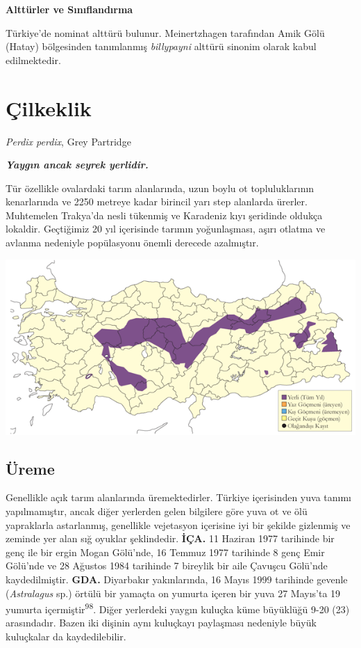 \documentclass[
  letterpaper,
  DIV=11,
  numbers=noendperiod]{scrreprt}
\begin{document}
\textbf{Alttürler ve Sınıflandırma}

Türkiye'de nominat alttürü bulunur. Meinertzhagen tarafından Amik Gölü
(Hatay) bölgesinden tanımlanmış \emph{billypayni} alttürü sinonim olarak
kabul edilmektedir.

\hypertarget{uxe7ilkeklik}{%
\section{Çilkeklik}\label{uxe7ilkeklik}}

\emph{Perdix perdix}, Grey Partridge

\textbf{\emph{Yaygın ancak seyrek yerlidir.}}

Tür özellikle ovalardaki tarım alanlarında, uzun boylu ot
topluluklarının kenarlarında ve 2250 metreye kadar birincil yarı step
alanlarda ürerler. Muhtemelen Trakya'da nesli tükenmiş ve Karadeniz kıyı
şeridinde oldukça lokaldir. Geçtiğimiz 20 yıl içerisinde tarımın
yoğunlaşması, aşırı otlatma ve avlanma nedeniyle popülasyonu önemli
derecede azalmıştır.

\includegraphics{images/harita_Page_042.png}

\hypertarget{uxfcreme-41}{%
\subsection{\texorpdfstring{\textbf{Üreme}}{Üreme}}\label{uxfcreme-41}}

Genellikle açık tarım alanlarında üremektedirler. Türkiye içerisinden
yuva tanımı yapılmamıştır, ancak diğer yerlerden gelen bilgilere göre
yuva ot ve ölü yapraklarla astarlanmış, genellikle vejetasyon içerisine
iyi bir şekilde gizlenmiş ve zeminde yer alan sığ oyuklar şeklindedir.
\textbf{İÇA.} 11 Haziran 1977 tarihinde bir genç ile bir ergin Mogan
Gölü'nde, 16 Temmuz 1977 tarihinde 8 genç Emir Gölü'nde ve 28 Ağustos
1984 tarihinde 7 bireylik bir aile Çavuşcu Gölü'nde kaydedilmiştir.
\textbf{GDA.} Diyarbakır yakınlarında, 16 Mayıs 1999 tarihinde gevenle
(\emph{Astralagus} sp.) örtülü bir yamaçta on yumurta içeren bir yuva 27
Mayıs'ta 19 yumurta içermiştir\textsuperscript{98}. Diğer yerlerdeki
yaygın kuluçka küme büyüklüğü 9-20 (23) arasındadır. Bazen iki dişinin
aynı kuluçkayı paylaşması nedeniyle büyük kuluçkalar da kaydedilebilir.
\end{document}
